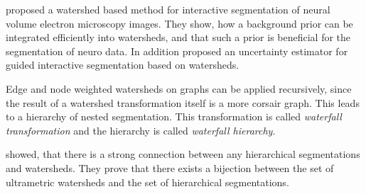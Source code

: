 \citet{straehle_2011_miccai} proposed a watershed based method for interactive segmentation
of neural volume electron  microscopy images.
They show, how a background prior can be  integrated efficiently into watersheds,
and that such a prior is beneficial for the segmentation of neuro data.
In addition \citet{straehle_2012_cvpr} proposed an uncertainty estimator for
guided interactive segmentation based on watersheds.

\label{sec:rw_waterfall}

Edge and node weighted watersheds on graphs can be applied recursively, since
the result of a watershed transformation itself is a more corsair graph.
This leads to a hierarchy of nested segmentation.
This transformation is called \emph{waterfall transformation} \cite{beuchner_1994_waterfall} and
the hierarchy is called \emph{waterfall hierarchy}.

 showed, that there is a
strong connection between any hierarchical segmentations
and watersheds.
They prove that there exists a bijection between
the set of ultrametric watersheds\citep{najman_2010_corr} and the set of hierarchical segmentations.

